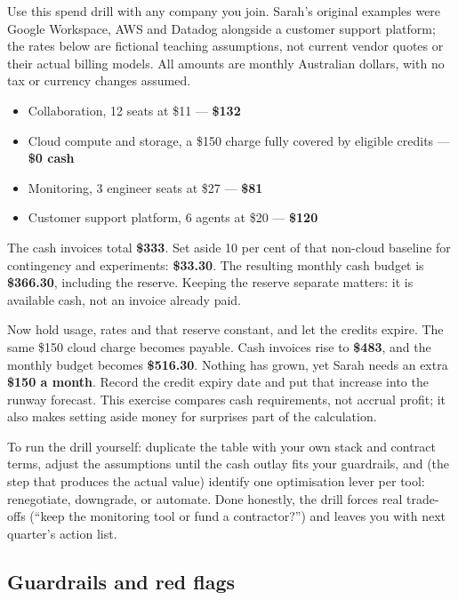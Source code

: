 Use this spend drill with any company you join. Sarah's original examples were Google Workspace, AWS and Datadog alongside a customer support platform; the rates below are fictional teaching assumptions, not current vendor quotes or their actual billing models. All amounts are monthly Australian dollars, with no tax or currency changes assumed.


\begin{itemize}[leftmargin=*]
\item Collaboration, 12 seats at \$11 — \textbf{\$132}
\item Cloud compute and storage, a \$150 charge fully covered by eligible credits — \textbf{\$0 cash}
\item Monitoring, 3 engineer seats at \$27 — \textbf{\$81}
\item Customer support platform, 6 agents at \$20 — \textbf{\$120}
\end{itemize}

The cash invoices total \textbf{\$333}. Set aside 10 per cent of that non-cloud baseline for contingency and experiments: \textbf{\$33.30}. The resulting monthly cash budget is \textbf{\$366.30}, including the reserve. Keeping the reserve separate matters: it is available cash, not an invoice already paid.


Now hold usage, rates and that reserve constant, and let the credits expire. The same \$150 cloud charge becomes payable. Cash invoices rise to \textbf{\$483}, and the monthly budget becomes \textbf{\$516.30}. Nothing has grown, yet Sarah needs an extra \textbf{\$150 a month}. Record the credit expiry date and put that increase into the runway forecast. This exercise compares cash requirements, not accrual profit; it also makes setting aside money for surprises part of the calculation.


To run the drill yourself: duplicate the table with your own stack and contract terms, adjust the assumptions until the cash outlay fits your guardrails, and (the step that produces the actual value) identify one optimisation lever per tool: renegotiate, downgrade, or automate. Done honestly, the drill forces real trade-offs (``keep the monitoring tool or fund a contractor?'') and leaves you with next quarter's action list.



\subsection{Guardrails and red flags}


